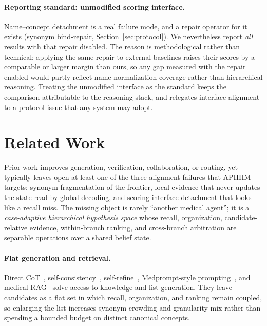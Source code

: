 \paragraph{Reporting standard: unmodified scoring interface.}
Name--concept detachment is a real failure mode, and a repair operator for it exists (synonym bind-repair, Section~\ref{sec:protocol}).
We nevertheless report \emph{all} results with that repair disabled.
The reason is methodological rather than technical: applying the same repair to external baselines raises their scores by a comparable or larger margin than ours, so any gap measured with the repair enabled would partly reflect name-normalization coverage rather than hierarchical reasoning.
Treating the unmodified interface as the standard keeps the comparison attributable to the reasoning stack, and relegates interface alignment to a protocol issue that any system may adopt.

\section{Related Work}
\label{sec:related}

Prior work improves generation, verification, collaboration, or routing, yet typically leaves open at least one of the three alignment failures that APHHM targets: synonym fragmentation of the frontier, local evidence that never updates the state read by global decoding, and scoring-interface detachment that looks like a recall miss.
The missing object is rarely ``another medical agent''; it is a \emph{case-adaptive hierarchical hypothesis space} whose recall, organization, candidate-relative evidence, within-branch ranking, and cross-branch arbitration are separable operations over a shared belief state.

\paragraph{Flat generation and retrieval.}
Direct CoT~\cite{wei2022cot}, self-consistency~\cite{wang2023selfconsistency}, self-refine~\cite{madaan2023selfrefine}, Medprompt-style prompting~\cite{medprompt}, and medical RAG~\cite{lewis2020rag,xiong2024medrag,medrag,imedrag} solve access to knowledge and list generation.
They leave candidates as a flat set in which recall, organization, and ranking remain coupled, so enlarging the list increases synonym crowding and granularity mix rather than spending a bounded budget on distinct canonical concepts.

